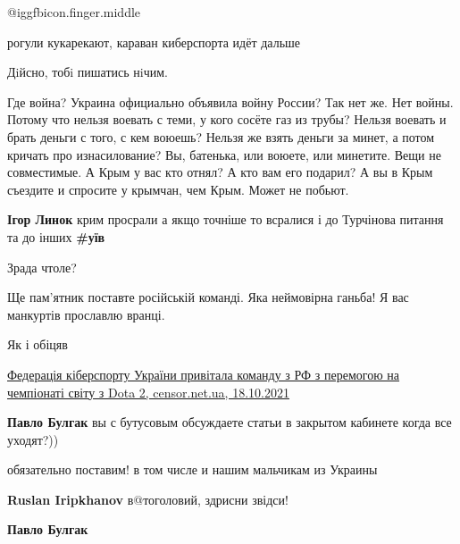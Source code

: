 \begin{itemize}
\begin{itemize} %
 @igg{fbicon.finger.middle} 

рогули кукарекают, караван киберспорта идёт дальше

Дiйсно, тобi пишатись нiчим.


Где война? Украина официально объявила войну России? Так нет же. Нет войны.
Потому что нельзя воевать с теми, у кого сосёте газ из трубы? Нельзя воевать и
брать деньги с того, с кем воюешь? Нельзя же взять деньги за минет, а потом
кричать про изнасилование? Вы, батенька, или воюете, или минетите. Вещи не
совместимые. А Крым у вас кто отнял? А кто вам его подарил? А вы в Крым
съездите и спросите у крымчан, чем Крым. Может не побьют.

\textbf{Ігор Линок} крим просрали а якщо точніше то всралися і до Турчінова питання та до інших \textbf{\#уїв}

Зрада чтоле?


\end{itemize} %


Ще пам'ятник поставте російській команді. Яка неймовірна ганьба! Я вас манкуртів прославлю вранці.

\begin{itemize} %
Як і обіцяв

\href{https://censor.net/ua/news/3294306/federatsiya_kibersportu_ukrayiny_pryvitala_komandu_z_rf_z_peremogoyu_na_chempionati_svitu_z_dota_2}{%
Федерація кіберспорту України привітала команду з РФ з перемогою на чемпіонаті світу з Dota 2, censor.net.ua,%
18.10.2021%
}

\begin{itemize} %
\textbf{Павло Булгак} вы с бутусовым обсуждаете статьи в закрытом кабинете когда все уходят?))
\end{itemize} %

обязательно поставим! в том числе и нашим мальчикам из Украины

\begin{itemize} %
\textbf{Ruslan Iripkhanov} в@тоголовий, здрисни звідси!
\end{itemize} %

\textbf{Павло Булгак} 


\end{itemize}
\end{itemize}
